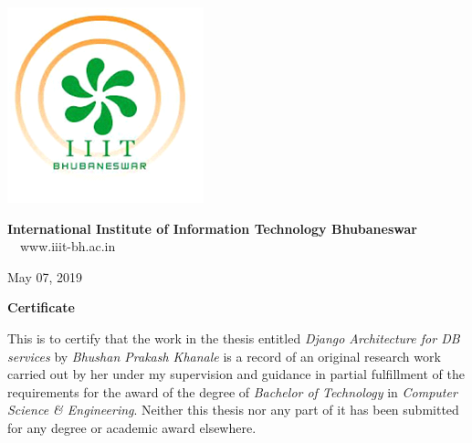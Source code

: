\thispagestyle{empty} 
\begin{minipage}{.1\linewidth}
\hspace*{-1.8cm}
\vspace*{-1.8cm}
\includegraphics[scale=0.65]{ch0/IIITlogo.png}
\end{minipage}
\hspace{.2cm}
\begin{minipage}{.9\linewidth}
{\Large
\textbf{International Institute of Information Technology Bhubaneswar\\}}
{\large
{}}
\textmd{$\quad$www.iiit-bh.ac.in}
\end{minipage}

\vspace{.35in}
%
\fontsize{12}{14}
\selectfont
\begin{flushright}
May 07, 2019
\end{flushright}
\vspace{1.0in}

\centerline{\Large{\bf Certificate}}
\vspace{1cm}
\noindent
This is to certify that the work in the thesis entitled
{\it Django Architecture for DB services } by {\it Bhushan Prakash Khanale}
is a record of an original research work carried out by her under my
supervision and guidance in partial fulfillment of the requirements for
the award of the degree of \textit{Bachelor of Technology} in
\textit{Computer Science \& Engineering}. Neither this thesis nor any part of
it has been submitted for any degree or academic award elsewhere.
\vspace*{0.5in}

